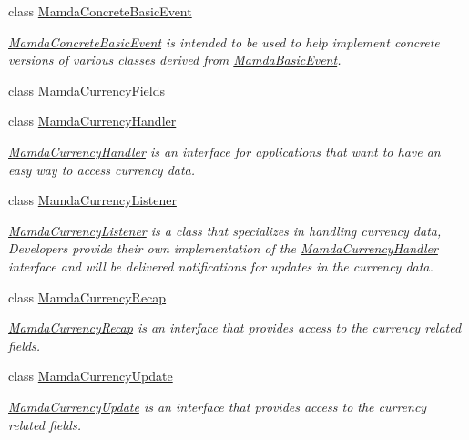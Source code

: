 \begin{CompactItemize}
class \hyperlink{classWombat_1_1MamdaConcreteBasicEvent}{Mamda\-Concrete\-Basic\-Event}
\begin{CompactList}\small\item\em \hyperlink{classWombat_1_1MamdaConcreteBasicEvent}{Mamda\-Concrete\-Basic\-Event} is intended to be used to help implement concrete versions of various classes derived from \hyperlink{classWombat_1_1MamdaBasicEvent}{Mamda\-Basic\-Event}. \item\end{CompactList}\item 
class \hyperlink{classWombat_1_1MamdaCurrencyFields}{Mamda\-Currency\-Fields}
\item 
class \hyperlink{classWombat_1_1MamdaCurrencyHandler}{Mamda\-Currency\-Handler}
\begin{CompactList}\small\item\em \hyperlink{classWombat_1_1MamdaCurrencyHandler}{Mamda\-Currency\-Handler} is an interface for applications that want to have an easy way to access currency data. \item\end{CompactList}\item 
class \hyperlink{classWombat_1_1MamdaCurrencyListener}{Mamda\-Currency\-Listener}
\begin{CompactList}\small\item\em \hyperlink{classWombat_1_1MamdaCurrencyListener}{Mamda\-Currency\-Listener} is a class that specializes in handling currency data, Developers provide their own implementation of the \hyperlink{classWombat_1_1MamdaCurrencyHandler}{Mamda\-Currency\-Handler} interface and will be delivered notifications for updates in the currency data. \item\end{CompactList}\item 
class \hyperlink{classWombat_1_1MamdaCurrencyRecap}{Mamda\-Currency\-Recap}
\begin{CompactList}\small\item\em \hyperlink{classWombat_1_1MamdaCurrencyRecap}{Mamda\-Currency\-Recap} is an interface that provides access to the currency related fields. \item\end{CompactList}\item 
class \hyperlink{classWombat_1_1MamdaCurrencyUpdate}{Mamda\-Currency\-Update}
\begin{CompactList}\small\item\em \hyperlink{classWombat_1_1MamdaCurrencyUpdate}{Mamda\-Currency\-Update} is an interface that provides access to the currency related fields. \item\end{CompactList}\item 

\end{CompactItemize}
